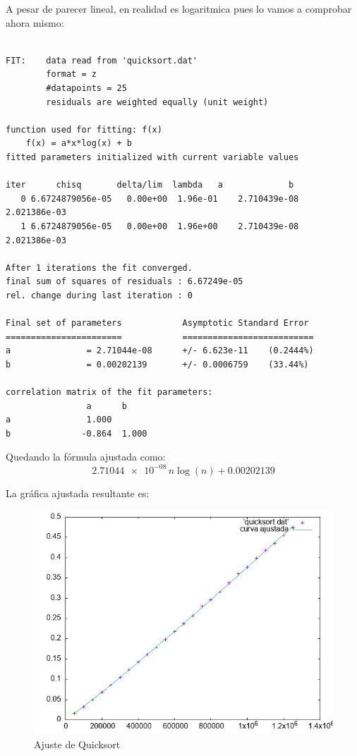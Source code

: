 \documentclass[12pt, spanish]{article}
\begin{document}
A pesar de parecer lineal, en realidad es logaritmica pues lo vamos a comprobar ahora mismo:
\begin{verbatim}

FIT:    data read from 'quicksort.dat'
        format = z
        #datapoints = 25
        residuals are weighted equally (unit weight)

function used for fitting: f(x)
	f(x) = a*x*log(x) + b
fitted parameters initialized with current variable values

iter      chisq       delta/lim  lambda   a             b
   0 6.6724879056e-05   0.00e+00  1.96e-01    2.710439e-08   2.021386e-03
   1 6.6724879056e-05   0.00e+00  1.96e+00    2.710439e-08   2.021386e-03

After 1 iterations the fit converged.
final sum of squares of residuals : 6.67249e-05
rel. change during last iteration : 0

Final set of parameters            Asymptotic Standard Error
=======================            ==========================
a               = 2.71044e-08      +/- 6.623e-11    (0.2444%)
b               = 0.00202139       +/- 0.0006759    (33.44%)

correlation matrix of the fit parameters:
                a      b
a               1.000
b              -0.864  1.000
\end{verbatim}

Quedando la fórmula ajustada como:
 \[ \num{2.71044e-08}\,n\log(n)+0.00202139 \]

La gráfica ajustada resultante es:
\begin{figure}[H]
  \centering
  \includegraphics[scale = 0.9]{AjusteQuicksort.jpeg}
  \caption{Ajuste de Quicksort}
\end{figure}
\end{document}
